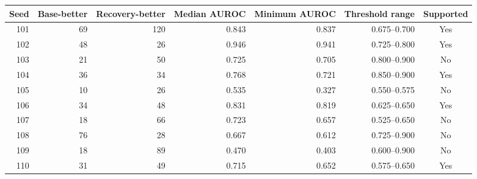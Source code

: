 \begin{tabular}{rrrrrrc}
\toprule
Seed & Base-better & Recovery-better & Median AUROC & Minimum AUROC & Threshold range & Supported \\
\midrule
101 & 69 & 120 & 0.843 & 0.837 & 0.675--0.700 & Yes \\
102 & 48 & 26 & 0.946 & 0.941 & 0.725--0.800 & Yes \\
103 & 21 & 50 & 0.725 & 0.705 & 0.800--0.900 & No \\
104 & 36 & 34 & 0.768 & 0.721 & 0.850--0.900 & Yes \\
105 & 10 & 26 & 0.535 & 0.327 & 0.550--0.575 & No \\
106 & 34 & 48 & 0.831 & 0.819 & 0.625--0.650 & Yes \\
107 & 18 & 66 & 0.723 & 0.657 & 0.525--0.650 & No \\
108 & 76 & 28 & 0.667 & 0.612 & 0.725--0.900 & No \\
109 & 18 & 89 & 0.470 & 0.403 & 0.600--0.900 & No \\
110 & 31 & 49 & 0.715 & 0.652 & 0.575--0.650 & Yes \\
\bottomrule
\end{tabular}
